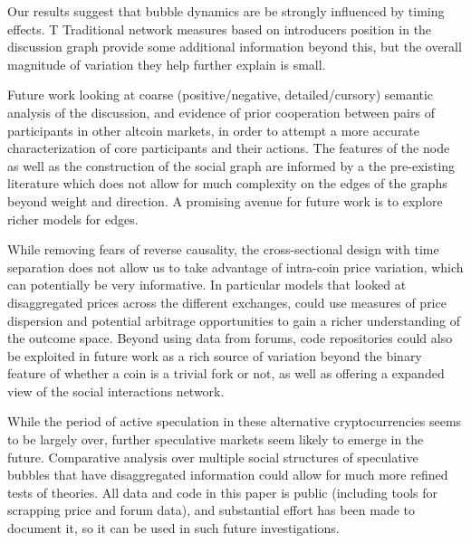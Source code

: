 Our results suggest that bubble dynamics are be strongly influenced by timing effects. T
Traditional network measures based on introducers position in the discussion graph provide some additional  information beyond this, but the overall magnitude of variation they help further explain is small.

Future work looking at coarse (positive/negative, detailed/cursory) semantic analysis of the discussion, and evidence of prior cooperation between pairs of participants in other altcoin markets, in order to attempt a more accurate characterization of core participants and their actions.
The features of the node as well as the construction of the social graph are informed by a the pre-existing literature which does not allow for much complexity on the edges of the graphs beyond weight and direction.
A promising avenue for future work is to explore richer models for edges. 

While removing fears of reverse causality, the cross-sectional design with time separation does not allow us to take advantage of intra-coin price variation, which can potentially be very informative.
In particular models that looked at disaggregated prices across the different exchanges, could use measures of price dispersion and potential arbitrage opportunities to gain a richer understanding of the outcome space.
Beyond using data from forums, code repositories could also be exploited in future work as a rich source of variation beyond the binary feature of whether a coin is a trivial fork or not, as well as offering a expanded view of the social interactions network.

While the period of active speculation in these alternative cryptocurrencies seems to be largely over, further speculative markets seem likely to emerge in the future. Comparative analysis over multiple social structures of speculative bubbles that have disaggregated information could allow for much more refined tests of theories. 
All data and code in this paper is public (including tools for scrapping price and forum data), and substantial effort has been made to document it, so it can be used in such future investigations. 
